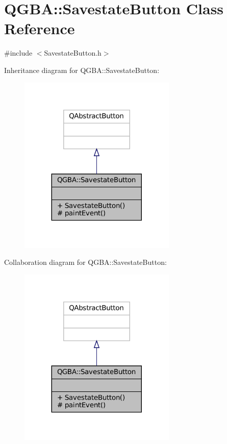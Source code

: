 \hypertarget{class_q_g_b_a_1_1_savestate_button}{}\section{Q\+G\+BA\+:\+:Savestate\+Button Class Reference}
\label{class_q_g_b_a_1_1_savestate_button}


{\ttfamily \#include $<$Savestate\+Button.\+h$>$}



Inheritance diagram for Q\+G\+BA\+:\+:Savestate\+Button\+:
\nopagebreak
\begin{figure}[H]
\begin{center}
\leavevmode
\includegraphics[width=212pt]{class_q_g_b_a_1_1_savestate_button__inherit__graph}
\end{center}
\end{figure}


Collaboration diagram for Q\+G\+BA\+:\+:Savestate\+Button\+:
\nopagebreak
\begin{figure}[H]
\begin{center}
\leavevmode
\includegraphics[width=212pt]{class_q_g_b_a_1_1_savestate_button__coll__graph}
\end{center}
\end{figure}
